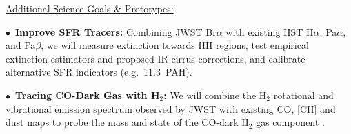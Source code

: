 \documentclass[12pt]{article}
\def\myitem{\par\hang\textindent }
\newenvironment{parhang}{\hangafter=1\hangindent=10pt}{\par}
\begin{document}
\noindent \underline{Additional Science Goals \& Prototypes:}

   
    \begin{parhang}
    \noindent
    $\bullet$~{\bf Improve SFR Tracers:} Combining JWST Br$\alpha$ with existing HST H$\alpha$, Pa$\alpha$, and Pa$\beta$, we will measure extinction towards H{\small II} regions, test empirical extinction estimators and proposed IR cirrus corrections, and calibrate alternative SFR indicators (e.g.\ 11.3\micron\ PAH).%
    \end{parhang}
    \begin{parhang}
    \noindent
    $\bullet$~{\bf Tracing CO-Dark Gas with H$_{2}$:} We will combine the H$_2$ rotational and vibrational emission spectrum observed by JWST with existing CO, [C{\small II}] and dust maps to probe the mass and state of the CO-dark H$_2$ gas component \citep[e.g.,][]{togi2016}.
    \end{parhang}
        
\end{document}
